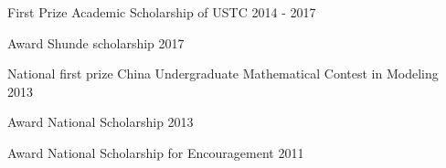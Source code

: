\begin{cvhonors}

  \cvhonor
    {First Prize} %
    {Academic Scholarship of USTC} %
    {} %
    {2014 - 2017} %
    
  \cvhonor
    {Award} %
    {Shunde scholarship} %
    {} %
    {2017} %
    
  \cvhonor
    {National first prize} %
    {China Undergraduate Mathematical Contest in Modeling} %
    {} %
    {2013} %

  \cvhonor
     {Award}
     {National Scholarship}
     {}
     {2013}

  \cvhonor
     {Award}
     {National Scholarship for Encouragement }
     {}
     {2011}


\end{cvhonors}
